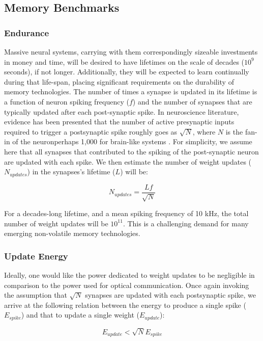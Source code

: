 \documentclass[twocolumn]{article}
\begin{document}
\subsection{Memory Benchmarks}
\subsubsection{Endurance}
Massive neural systems, carrying with them correspondingly sizeable investments in money and time, will be desired to have lifetimes on the scale of decades ($10^9$ seconds), if not longer. Additionally, they will be expected to learn continually during that life-span, placing significant requirements on the durability of memory technologies. The number of times a synapse is updated in its lifetime is a function of neuron spiking frequency ($f$) and the number of synapses that are typically updated after each post-synaptic spike. In neuroscience literature, evidence has been presented that the number of active presynaptic inputs required to trigger a postsynaptic spike roughly goes as $\sqrt{N}$, where $N$ is the fan-in of the neuron\textemdash perhaps 1,000 for brain-like systems \cite{vrso1996,vora2005}. For simplicity, we assume here that all synapses that contributed to the spiking of the post-synaptic neuron are updated with each spike. We then estimate the number of weight updates ($N_{updates}$) in the synapses's lifetime ($L$) will be:

\begin{equation}
    N_{updates} = \frac{Lf}{\sqrt{N}}
\end{equation}

For a decades-long lifetime, and a mean spiking frequency of 10 kHz, the total number of weight updates will be $10^{11}$. This is a challenging demand for many emerging non-volatile memory technologies.

\subsubsection{Update Energy}
Ideally, one would like the power dedicated to weight updates to be negligible in comparison to the power used for optical communication. Once again invoking the assumption that $\sqrt{N}$ synapses are updated with each postsynaptic spike, we arrive at the following relation between the energy to produce a single spike ($E_{spike}$) and that to update a single weight ($E_{update}$):

\begin{equation}
    E_{update} < \sqrt{N}E_{spike}
\end{equation}
\end{document}
